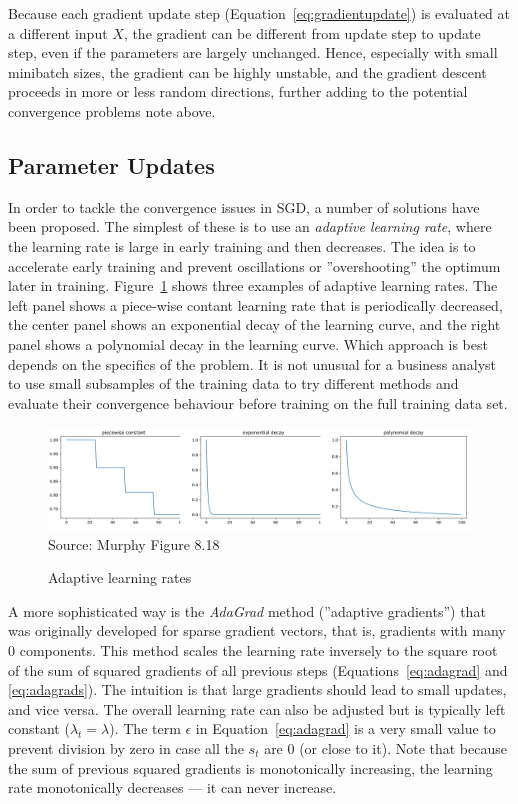 Because each gradient update step (Equation~\ref{eq:gradientupdate}) is evaluated at a different input $X$, the gradient can be different from update step to update step, even if the parameters are largely unchanged. Hence, especially with small minibatch sizes, the gradient can be highly unstable, and the gradient descent proceeds in more or less random directions, further adding to the potential convergence problems note above.

\subsection{Parameter Updates}

In order to tackle the convergence issues in SGD, a number of solutions have been proposed. The simplest of these is to use an \emph{adaptive learning rate}, where the learning rate is large in early training and then decreases. The idea is to accelerate early training and prevent oscillations or ''overshooting'' the optimum later in training. Figure~\ref{fig:screen5_chap15} shows three examples of adaptive learning rates. The left panel shows a piece-wise contant learning rate that is periodically decreased, the center panel shows an exponential decay of the learning curve, and the right panel shows a polynomial decay in the learning curve. Which approach is best depends on the specifics of the problem. It is not unusual for a business analyst to use small subsamples of the training data to try different methods and evaluate their convergence behaviour before training on the full training data set.

\begin{figure}
\includegraphics[width=\textwidth]{screen5.png} \\

\scriptsize Source: Murphy Figure 8.18
\caption{Adaptive learning rates}
\label{fig:screen5_chap15}
\end{figure}

A more sophisticated way is the \emph{AdaGrad} method (''adaptive gradients'') that was originally developed for sparse gradient vectors, that is, gradients with many $0$ components. This method scales the learning rate inversely to the square root of the sum of squared gradients of all previous steps (Equations~\ref{eq:adagrad} and \ref{eq:adagrads}). The intuition is that large gradients should lead to small updates, and vice versa. The overall learning rate can also be adjusted but is typically left constant ($\lambda_t = \lambda$). The term $\epsilon$ in Equation~\ref{eq:adagrad} is a very small value to prevent division by zero in case all the $s_t$ are 0 (or close to it). Note that because the sum of previous squared gradients is monotonically increasing, the learning rate monotonically decreases --- it can never increase.

